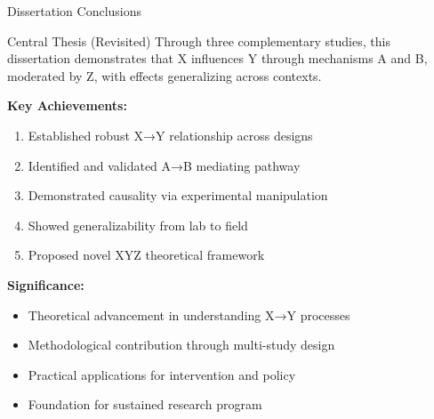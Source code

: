 \documentclass[aspectratio=169,12pt]{beamer}
\begin{document}
\begin{frame}{Dissertation Conclusions}
  \begin{exampleblock}{Central Thesis (Revisited)}
    Through three complementary studies, this dissertation demonstrates that X influences Y through mechanisms A and B, moderated by Z, with effects generalizing across contexts.
  \end{exampleblock}
  
  \vspace{0.5cm}
  
  \textbf{Key Achievements:}
  \begin{enumerate}
    \item Established robust X→Y relationship across designs
    \item Identified and validated A→B mediating pathway
    \item Demonstrated causality via experimental manipulation
    \item Showed generalizability from lab to field
    \item Proposed novel XYZ theoretical framework
  \end{enumerate}
  
  \vspace{0.5cm}
  
  \textbf{Significance:}
  \begin{itemize}
    \item Theoretical advancement in understanding X→Y processes
    \item Methodological contribution through multi-study design
    \item Practical applications for intervention and policy
    \item Foundation for sustained research program
  \end{itemize}
\end{frame}
\end{document}
